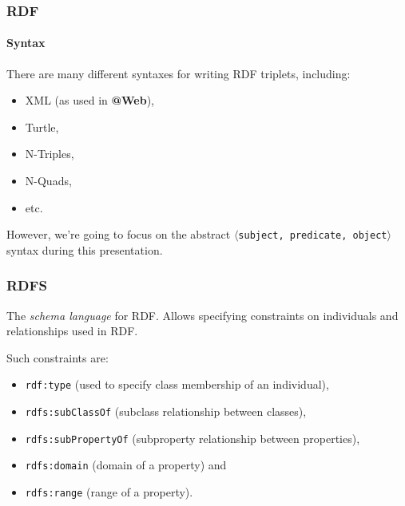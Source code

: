 \documentclass{beamer}
\makeatletter
\newcommand{\atweb}{\textbf{@Web}\xspace}
\newcommand{\triplet}[1]{$\langle$\texttt{#1}$\rangle$}
\makeatother
\begin{document}
\begin{frame}
  \frametitle{RDF}
  \framesubtitle{Syntax}

  There are many different syntaxes for writing RDF triplets, including:

  \pause

  \begin{itemize}
    \item XML (as used in \atweb),

    \pause

    \item Turtle,
    \item N-Triples,
    \item N-Quads,
    \item etc.
  \end{itemize}

  \pause

  However, we're going to focus on the abstract \triplet{subject, predicate,
  object} syntax during this presentation.
\end{frame}

\begin{frame}
  \frametitle{RDFS}

  The \textit{schema language} for RDF. Allows specifying constraints on
  individuals and relationships used in RDF.

  \pause

  \medskip

  Such constraints are:

  \pause

  \begin{itemize}
    \item \texttt{rdf:type} (used to specify class membership of an individual),
    \item \texttt{rdfs:subClassOf} (subclass relationship between classes),
    \item \texttt{rdfs:subPropertyOf} (subproperty relationship between
      properties),
    \item \texttt{rdfs:domain} (domain of a property) and
    \item \texttt{rdfs:range} (range of a property).
  \end{itemize}
\end{frame}
\end{document}
